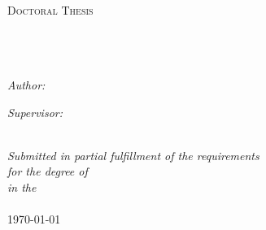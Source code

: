 \documentclass[11pt, oneside]{Thesis} %
\begin{document}
\begin{titlepage}
\begin{center}

\textsc{\LARGE \univname}\\[1.5cm] %
\textsc{\Large Doctoral Thesis}\\[0.5cm] %

\HRule \\[0.4cm] %
{\huge \bfseries \ttitle}\\[0.4cm] %
\HRule \\[1.5cm] %
 
\begin{minipage}{0.4\textwidth}
\begin{flushleft} \large
\emph{Author:}\\
{\authornames} %
\end{flushleft}
\end{minipage}
\begin{minipage}{0.4\textwidth}
\begin{flushright} \large
\emph{Supervisor:} \\
{\supname} %
\end{flushright}
\end{minipage}\\[3cm]
 
\large \textit{Submitted in partial fulfillment of the requirements\\ for the degree of \degreename}\\[0.3cm] %
\textit{in the}\\[0.4cm]
\deptname\\[2cm] %
 
{\large \today}\\[4cm] %
 
\vfill
\end{center}

\end{titlepage}

\end{document}
